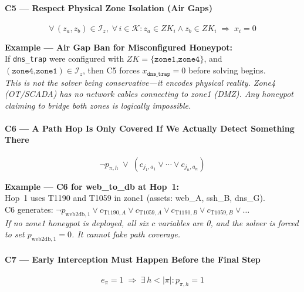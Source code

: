 \documentclass[journal]{IEEEtran}
\newcommand{\calK}{\mathcal{K}}
\begin{document}
\paragraph{C5 --- Respect Physical Zone Isolation (Air Gaps)}
\begin{equation}
  \forall\,(z_a,z_b) \in \mathcal{I}_z,\;
  \forall\, i \in \calK :
  z_a \in ZK_i \wedge z_b \in ZK_i
  \;\Longrightarrow\; x_i = 0
\end{equation}

\begin{examplebox}
\textbf{Example --- Air Gap Ban for Misconfigured Honeypot:}\\[3pt]
If \texttt{dns\_trap} were configured with
$ZK=\{\texttt{zone1,zone4}\}$, and
$(\texttt{zone4,zone1}) \in \mathcal{I}_z$, then C5
forces $x_{\texttt{dns\_trap}}=0$ before solving begins.\\[3pt]
\textit{This is not the solver being conservative---it
encodes physical reality.
Zone4 (OT/SCADA) has no network cables connecting to
zone1 (DMZ).
Any honeypot claiming to bridge both zones is logically
impossible.}
\end{examplebox}

\paragraph{C6 --- A Path Hop Is Only Covered If We Actually
Detect Something There}
\begin{equation}
  \neg p_{\pi,h} \;\vee\;
  (c_{j_1,a_1} \vee \cdots \vee c_{j_n,a_n})
\end{equation}

\begin{examplebox}
\textbf{Example --- C6 for web\_to\_db at Hop~1:}\\[3pt]
Hop~1 uses T1190 and T1059 in zone1 (assets: web\_A,
ssh\_B, dns\_G).\\
C6 generates:
$\neg p_{\text{web2db},1} \vee c_{\text{T1190},A}
\vee c_{\text{T1059},A} \vee c_{\text{T1190},B}
\vee c_{\text{T1059},B} \vee \ldots$\\[3pt]
\textit{If no zone1 honeypot is deployed, all six $c$
variables are 0, and the solver is forced to set
$p_{\text{web2db},1}=0$.
It cannot fake path coverage.}
\end{examplebox}

\paragraph{C7 --- Early Interception Must Happen Before the
Final Step}
\begin{equation}
  e_\pi = 1 \;\Longrightarrow\;
  \exists\, h < |\pi| : p_{\pi,h} = 1
\end{equation}
\end{document}
